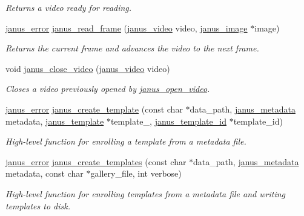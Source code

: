 \begin{DoxyCompactItemize}
\begin{DoxyCompactList}\small\item\em Returns a video ready for reading. \end{DoxyCompactList}\item 
\hyperlink{group__janus_ga1b275e4dade484951b366f785597b8f6}{janus\+\_\+error} \hyperlink{group__janus__io_ga0cb373a82d205208ac3e4cc90af4c9eb}{janus\+\_\+read\+\_\+frame} (\hyperlink{group__janus__io_gab8d7aec0b23d9584154fba8594845022}{janus\+\_\+video} video, \hyperlink{structjanus__image}{janus\+\_\+image} $\ast$image)
\begin{DoxyCompactList}\small\item\em Returns the current frame and advances the video to the next frame. \end{DoxyCompactList}\item 
void \hyperlink{group__janus__io_ga8c0bf830dd4a05136afbfe9a400e7209}{janus\+\_\+close\+\_\+video} (\hyperlink{group__janus__io_gab8d7aec0b23d9584154fba8594845022}{janus\+\_\+video} video)
\begin{DoxyCompactList}\small\item\em Closes a video previously opened by \hyperlink{group__janus__io_ga8063198a80f9dcb19bbd736c98c1a238}{janus\+\_\+open\+\_\+video}. \end{DoxyCompactList}\item 
\hyperlink{group__janus_ga1b275e4dade484951b366f785597b8f6}{janus\+\_\+error} \hyperlink{group__janus__io_gab4ce5c0ca38f8f7f5f20923efb3f2ecf}{janus\+\_\+create\+\_\+template} (const char $\ast$data\+\_\+path, \hyperlink{group__janus__io_gaeddd0e276eebe8616d41808eed8dff16}{janus\+\_\+metadata} metadata, \hyperlink{group__janus_gaabac6b357615bbd03a082c714190e2d0}{janus\+\_\+template} $\ast$template\+\_\+, \hyperlink{group__janus_ga666a973aaa28bebd89ea5da37853bb87}{janus\+\_\+template\+\_\+id} $\ast$template\+\_\+id)
\begin{DoxyCompactList}\small\item\em High-\/level function for enrolling a template from a metadata file. \end{DoxyCompactList}\item 
\hyperlink{group__janus_ga1b275e4dade484951b366f785597b8f6}{janus\+\_\+error} \hyperlink{group__janus__io_ga9c605621407921191edc8d20ce193deb}{janus\+\_\+create\+\_\+templates} (const char $\ast$data\+\_\+path, \hyperlink{group__janus__io_gaeddd0e276eebe8616d41808eed8dff16}{janus\+\_\+metadata} metadata, const char $\ast$gallery\+\_\+file, int verbose)
\begin{DoxyCompactList}\small\item\em High-\/level function for enrolling templates from a metadata file and writing templates to disk. \end{DoxyCompactList}\item 

\end{DoxyCompactItemize}
